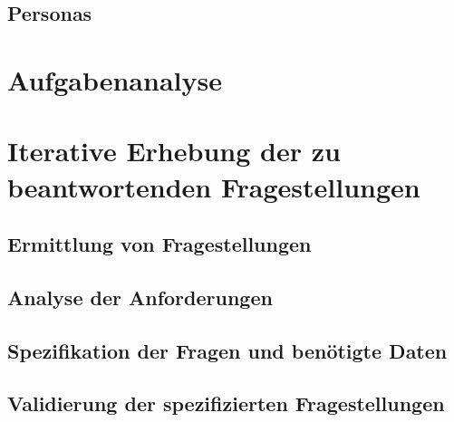 \subsection{Personas}

\section{Aufgabenanalyse}

\section{Iterative Erhebung der zu beantwortenden Fragestellungen}
\subsection{Ermittlung von Fragestellungen}
\subsection{Analyse der Anforderungen}
\subsection{Spezifikation der Fragen und benötigte Daten}
\subsection{Validierung der spezifizierten Fragestellungen}
